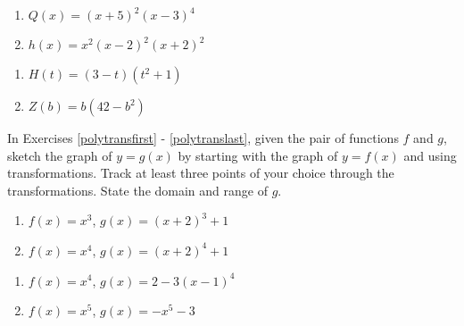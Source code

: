 \begin{multicols}{2}
\begin{enumerate}
\setcounter{enumi}{\value{HW}}

\item $Q(x) = (x + 5)^{2}(x - 3)^{4}$
\item $h(x) = x^2(x-2)^2(x+2)^2$

\setcounter{HW}{\value{enumi}}
\end{enumerate}
\end{multicols}


\begin{multicols}{2}
\begin{enumerate}
\setcounter{enumi}{\value{HW}}

\item $H(t) = (3-t)(t^2+1)$
\item $Z(b) = b(42 - b^{2})$ \label{zeromultgraphlast}

\setcounter{HW}{\value{enumi}}
\end{enumerate}
\end{multicols}

In Exercises \ref{polytransfirst} - \ref{polytranslast}, given the pair of functions $f$ and $g$, sketch the graph of $y=g(x)$ by starting with the graph of $y = f(x)$ and using transformations.  Track at least three points of your choice through the transformations. State the domain and range of $g$.

\begin{multicols}{2}
\begin{enumerate}
\setcounter{enumi}{\value{HW}}

\item $f(x) = x^3$,  $g(x) = (x + 2)^{3} + 1$ \label{polytransfirst}
\item $f(x) = x^4$, $g(x) = (x + 2)^{4} + 1$

\setcounter{HW}{\value{enumi}}
\end{enumerate}
\end{multicols}

\begin{multicols}{2}
\begin{enumerate}
\setcounter{enumi}{\value{HW}}

\item $f(x) = x^4$, $g(x) = 2 - 3(x - 1)^{4}$
\item $f(x) = x^5$, $g(x) = -x^{5} - 3$

\setcounter{HW}{\value{enumi}}
\end{enumerate}
\end{multicols}

